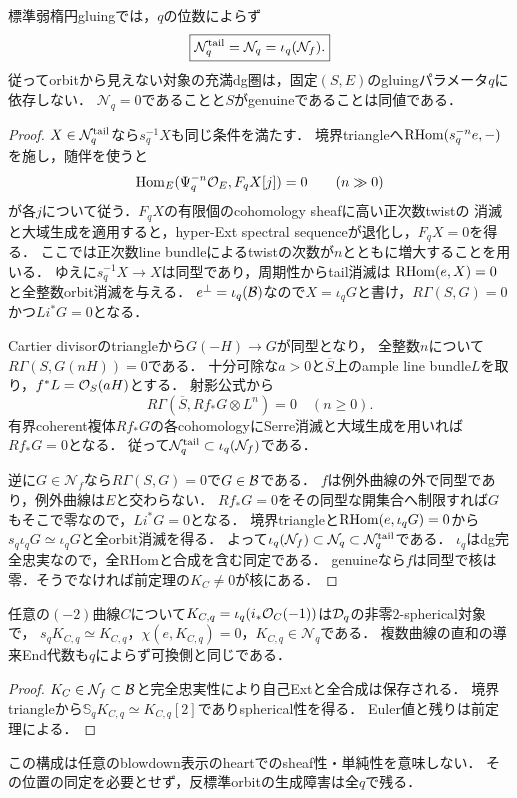 \begin{theorem}[全orbit核と古典的収縮核の同定]\label{thm:weak-orbit-kernel}
標準弱楕円gluingでは，$q$の位数によらず
\begin{equation}\label{eq:weak-orbit-kernel}
 \boxed{\mathcal N_q^{\rm tail}=\mathcal N_q=\iota_q(\mathcal N_f).}
\end{equation}
従ってorbitから見えない対象の充満dg圏は，固定$(S,E)$のgluingパラメータ$q$に依存しない．
$\mathcal N_q=0$であることと$S$がgenuineであることは同値である．
\end{theorem}
\begin{proof}
$X\in\mathcal N_q^{\rm tail}$なら$s_q^{-1}X$も同じ条件を満たす．
境界triangleへ$\operatorname{RHom}(s_q^{-n}e,-)$を施し，随伴を使うと
\[
 \operatorname{Hom}_E(\Psi_q^{-n}\mathcal O_E,F_qX[j])=0\qquad(n\gg0)
\]
が各$j$について従う．$F_qX$の有限個のcohomology sheafに高い正次数twistの
消滅と大域生成を適用すると，hyper-Ext spectral sequenceが退化し，$F_qX=0$を得る．
ここでは正次数line bundleによるtwistの次数が$n$とともに増大することを用いる．
ゆえに$s_q^{-1}X\to X$は同型であり，周期性からtail消滅は
$\operatorname{RHom}(e,X)=0$と全整数orbit消滅を与える．
$e^\perp=\iota_q(\mathcal B)$なので$X=\iota_qG$と書け，$R\Gamma(S,G)=0$かつ$Li^*G=0$となる．

Cartier divisorのtriangleから$G(-H)\to G$が同型となり，
全整数$n$について$R\Gamma(S,G(nH))=0$である．
十分可除な$a>0$と$\overline S$上のample line bundle$L$を取り，$f^*L=\mathcal O_S(aH)$とする．
射影公式から
\[
 R\Gamma(\overline S,Rf_*G\otimes L^n)=0\quad(n\ge0).
\]
有界coherent複体$Rf_*G$の各cohomologyにSerre消滅と大域生成を用いれば$Rf_*G=0$となる．
従って$\mathcal N_q^{\rm tail}\subset\iota_q(\mathcal N_f)$である．

逆に$G\in\mathcal N_f$なら$R\Gamma(S,G)=0$で$G\in\mathcal B$である．
$f$は例外曲線の外で同型であり，例外曲線は$E$と交わらない．
$Rf_*G=0$をその同型な開集合へ制限すれば$G$もそこで零なので，$Li^*G=0$となる．
境界triangleと$\operatorname{RHom}(e,\iota_qG)=0$から$s_q\iota_qG\simeq\iota_qG$と全orbit消滅を得る．
よって$\iota_q(\mathcal N_f)\subset\mathcal N_q\subset\mathcal N_q^{\rm tail}$である．
$\iota_q$はdg完全忠実なので，全RHomと合成を含む同定である．
genuineなら$f$は同型で核は零．そうでなければ前定理の$K_C\ne0$が核にある．
\end{proof}

\begin{corollary}[実在する非可換零指数spherical対象]\label{cor:zero-spherical-persistence}
任意の$(-2)$曲線$C$について$K_{C,q}=\iota_q(i_*\mathcal O_C(-1))$は$\mathcal D_q$の非零$2$-spherical対象で，
$s_qK_{C,q}\simeq K_{C,q}$，$\chi(e,K_{C,q})=0$，$K_{C,q}\in\mathcal N_q$である．
複数曲線の直和の導来End代数も$q$によらず可換側と同じである．
\end{corollary}
\begin{proof}
$K_C\in\mathcal N_f\subset\mathcal B$と完全忠実性により自己Extと全合成は保存される．
境界triangleから$\mathbb S_qK_{C,q}\simeq K_{C,q}[2]$でありspherical性を得る．
Euler値と残りは前定理による．
\end{proof}
この構成は任意のblowdown表示のheartでのsheaf性・単純性を意味しない．
その位置の同定を必要とせず，反標準orbitの生成障害は全$q$で残る．

